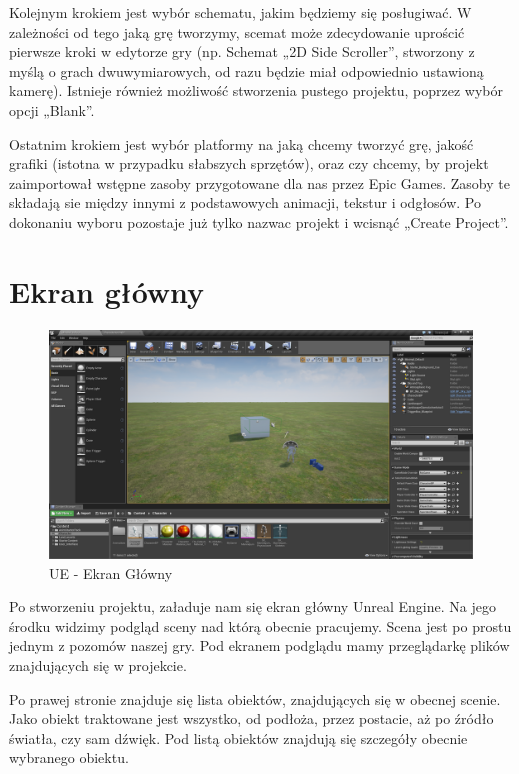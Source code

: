 \documentclass[brudnopis]{xmgr}
\begin{document}
Kolejnym krokiem jest wybór schematu, jakim będziemy się posługiwać. W zależności od tego jaką grę tworzymy, scemat może zdecydowanie uprościć pierwsze kroki w edytorze gry (np. Schemat „2D Side Scroller”, stworzony z myślą o grach dwuwymiarowych, od razu będzie miał odpowiednio ustawioną kamerę). Istnieje również możliwość stworzenia pustego projektu, poprzez wybór opcji „Blank”.

Ostatnim krokiem jest wybór platformy na jaką chcemy tworzyć grę, jakość grafiki (istotna w przypadku słabszych sprzętów), oraz czy chcemy, by projekt zaimportował wstępne zasoby przygotowane dla nas przez Epic Games. Zasoby te składają sie między innymi z podstawowych animacji, tekstur i odgłosów.
Po dokonaniu wyboru pozostaje już tylko nazwac projekt i wcisnąć „Create Project”.

\newpage
\section{Ekran główny}

\begin{figure}[!htb]
    \begin{center}
    \includegraphics[scale=0.25]{Screeny/Main}
    \end{center}
    \caption{UE - Ekran Główny}
\end{figure}

Po stworzeniu projektu, załaduje nam się ekran główny Unreal Engine. Na jego środku widzimy podgląd sceny nad którą obecnie pracujemy. Scena jest po prostu jednym z pozomów naszej gry.
Pod ekranem podglądu mamy przeglądarkę plików znajdujących się w projekcie. 

Po prawej stronie znajduje się lista obiektów, znajdujących się w obecnej scenie. Jako obiekt traktowane jest wszystko, od podłoża, przez postacie, aż po źródło światła, czy sam dźwięk.
Pod listą obiektów znajdują się szczegóły obecnie wybranego obiektu. 
\end{document}
